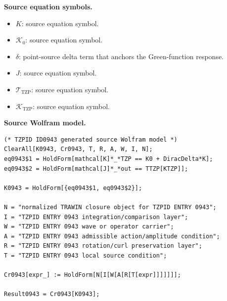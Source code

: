 \begin{minipage}[t]{0.49\linewidth}
\begingroup
\small
\raggedright
\textbf{Source equation symbols.}\par
\begin{itemize}[leftmargin=1.35em,itemsep=1pt,topsep=1pt,parsep=0pt]
    \item $K$: source equation symbol.
    \item $\mathcal{K}_0$: source equation symbol.
    \item $\delta$: point-source delta term that anchors the Green-function response.
    \item $J$: source equation symbol.
    \item $\mathcal{T}_{\mathrm{TZP}}$: source equation symbol.
    \item $\mathcal{K}_{\mathrm{TZP}}$: source equation symbol.
\end{itemize}
\endgroup
\end{minipage}\hfill
\begin{minipage}[t]{0.47\linewidth}
\begingroup
\scriptsize
\raggedright
\textbf{Source Wolfram model.}\par
\begin{Verbatim}[fontsize=\tiny,breaklines=true,breakanywhere=true]
(* TZPID ID0943 generated source Wolfram model *)
ClearAll[K0943, Cr0943, T, R, A, W, I, N];
eq0943$1 = HoldForm[mathcal[K]*_*TZP == K0 + DiracDelta*K];
eq0943$2 = HoldForm[mathcal[J]*_*out == TTZP[KTZP]];

K0943 = HoldForm[{eq0943$1, eq0943$2}];

N = "normalized TRAWIN closure object for TZPID ENTRY 0943";
I = "TZPID ENTRY 0943 integration/comparison layer";
W = "TZPID ENTRY 0943 wave or operator carrier";
A = "TZPID ENTRY 0943 admissible action/amplitude condition";
R = "TZPID ENTRY 0943 rotation/curl preservation layer";
T = "TZPID ENTRY 0943 local source condition";

Cr0943[expr_] := HoldForm[N[I[W[A[R[T[expr]]]]]]];

Result0943 = Cr0943[K0943];
\end{Verbatim}
\endgroup
\end{minipage}

